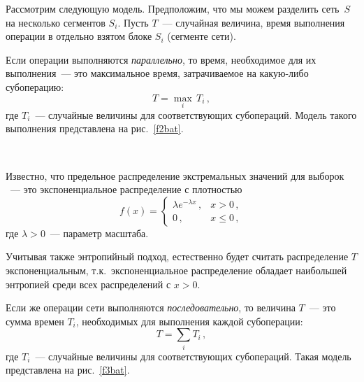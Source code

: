 \begin{multicols}{2}
Рассмотрим следующую модель. Предположим, что мы можем разделить
сеть~$S$ на несколько сегментов $S_i$. Пусть $T$~--- случайная величина,
время выполнения операции в отдельно взятом блоке $S_i$ (сегменте сети).

Если операции выполняются \textit{параллельно}, то время, необходимое
для их выполнения~--- это максимальное время, затрачиваемое на какую-либо
субоперацию:
$$
T = \underset{i}{\max}\, T_i\,,
$$
где $T_i$~--- случайные величины для со\-от\-вет\-ст\-ву\-ющих субопераций.
Модель такого выполнения пред\-став\-ле\-на на рис.~\ref{f2bat}.

\begin{figure*} %
\vspace*{1pt}
\begin{center}
\mbox{%
\epsfxsize=117.271mm
}
\end{center}
\vspace*{-9pt}
\end{figure*}

Известно, что предельное распределение экстремальных значений для
выборок ~--- это экспоненциальное распределение с плотностью~\cite{2bat}
$$
f(x) =
\begin{cases}
\lambda e^{-\lambda x}\,, & x>0\,,\\
0\,, & x\leq 0\,,
\end{cases}
$$
где $\lambda >0$~--- параметр масштаба.

 Учитывая также энтропийный подход, естественно будет считать
распределение $T$ экспоненциальным, т.к.\ экспоненциальное распределение
обладает наибольшей энтропией среди всех распределений с $x>0$.

Если же операции сети выполняются \textit{последовательно}, то величина
$T$~--- это сумма времен $T_i$, необходимых для выполнения каждой
субоперации:
$$
T = \sum\limits_i T_i\,,
$$
где $T_i$~--- случайные величины для со\-от\-вет\-ст\-ву\-ющих субопераций.
%
Такая модель представлена на рис.~\ref{f3bat}.

\begin{figure*} %
\vspace*{1pt}
\begin{center}
\mbox{%
\epsfxsize=139.592mm
}
\end{center}
\vspace*{-9pt}
\end{figure*}


\end{multicols}
